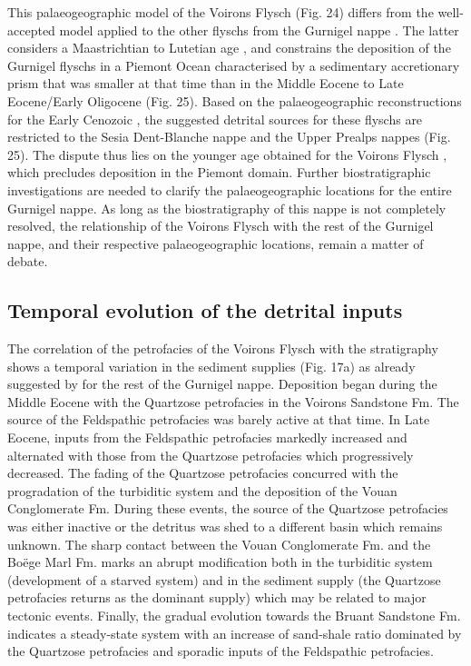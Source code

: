 \documentclass[twoside]{article}
\begin{document}
This palaeogeographic model of the Voirons Flysch (Fig. 24) differs from the well-accepted model applied to the other flyschs from the Gurnigel nappe \citep{Winkler1983,Winkler1984,Caron1989}. The latter considers a Maastrichtian to Lutetian age \citep{Stuijvenberg1979,Stuijvenberg1980b,Winkler1983,Winkler1984}, and constrains the deposition of the Gurnigel flyschs in a Piemont Ocean characterised by a sedimentary accretionary prism that was smaller at that time than in the Middle Eocene to Late Eocene/Early Oligocene (Fig. 25). Based on the palaeogeographic reconstructions for the Early Cenozoic \citep{Schmid1996,Handy2010}, the suggested detrital sources for these flyschs are restricted to the Sesia Dent-Blanche nappe and the Upper Prealps nappes (Fig. 25). The dispute thus lies on the younger age obtained for the Voirons Flysch \citep{Ujetz1996,Ospina-Ostios2013}, which precludes deposition in the Piemont domain. Further biostratigraphic investigations are needed to clarify the palaeogeographic locations for the entire Gurnigel nappe. As long as the biostratigraphy of this nappe is not completely resolved, the relationship of the Voirons Flysch with the rest of the Gurnigel nappe, and their respective palaeogeographic locations, remain a matter of debate.

\subsection{Temporal evolution of the detrital inputs}

The correlation of the petrofacies of the Voirons Flysch with the stratigraphy shows a temporal variation in the sediment supplies (Fig. 17a) as already suggested by \citep{Winkler1984} for the rest of the Gurnigel nappe. Deposition began during the Middle Eocene with the Quartzose petrofacies in the Voirons Sandstone Fm. The source of the Feldspathic petrofacies was barely active at that time. In Late Eocene, inputs from the Feldspathic petrofacies markedly increased and alternated with those from the Quartzose petrofacies which progressively decreased. The fading of the Quartzose petrofacies concurred with the progradation of the turbiditic system and the deposition of the Vouan Conglomerate Fm. During these events, the source of the Quartzose petrofacies was either inactive or the detritus was shed to a different basin which remains unknown. The sharp contact between the Vouan Conglomerate Fm. and the Boëge Marl Fm. marks an abrupt modification both in the turbiditic system (development of a starved system) and in the sediment supply (the Quartzose petrofacies returns as the dominant supply) which may be related to major tectonic events. Finally, the gradual evolution towards the Bruant Sandstone Fm. indicates a steady-state system with an increase of sand-shale ratio dominated by the Quartzose petrofacies and sporadic inputs of the Feldspathic petrofacies.
\end{document}

